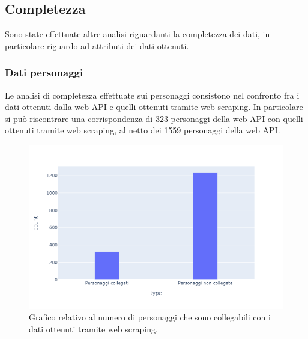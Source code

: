 \documentclass[
12pt, %
a4paper, %
oneside, %
headinclude,footinclude, %
BCOR5mm, %
]{scrartcl}
\begin{document}
\subsection{Completezza}
Sono state effettuate altre analisi riguardanti la completezza dei dati, in particolare riguardo ad attributi dei dati ottenuti.
\subsubsection{Dati personaggi}
Le analisi di completezza effettuate sui personaggi consistono nel confronto fra i dati ottenuti dalla web API e quelli ottenuti tramite web scraping. In particolare si può riscontrare una corrispondenza di 323 personaggi della web API con quelli ottenuti tramite web scraping, al netto dei 1559 personaggi della web API.
\begin{figure}[H]
  \includegraphics[scale=0.5]{plot_corrispondenza_personaggi.png}
  \caption{Grafico relativo al numero di personaggi che sono collegabili con i dati ottenuti tramite web scraping.}
\end{figure}
\end{document}
